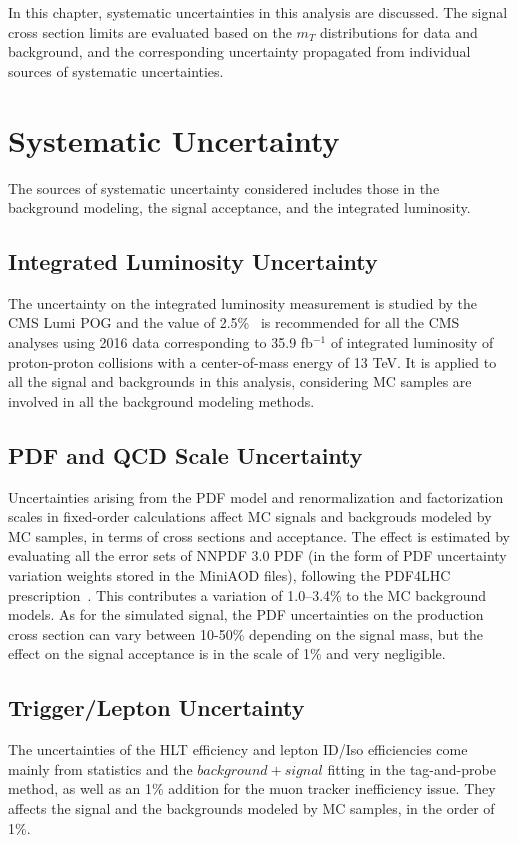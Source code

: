 In this chapter, systematic uncertainties in this analysis are discussed. The signal cross section limits are evaluated based on the $m_T$ distributions for data and background, and the corresponding uncertainty propagated from individual sources of systematic uncertainties.
\section{Systematic Uncertainty}
The sources of systematic uncertainty considered includes those in the background modeling, the signal acceptance, and the integrated luminosity.
\subsection{Integrated Luminosity Uncertainty}
The uncertainty on the integrated luminosity measurement is studied by the CMS Lumi POG and the value of 2.5\%~\cite{sys_lumi} is recommended for all the CMS analyses using 2016 data corresponding to 35.9 fb$^{-1}$ of integrated luminosity of proton-proton collisions with a center-of-mass energy of 13 TeV. It is applied to all the signal and backgrounds in this analysis, considering MC samples are involved in all the background modeling methods.
\subsection{PDF and QCD Scale Uncertainty}
Uncertainties arising from the PDF model and renormalization and factorization scales in fixed-order calculations affect MC signals and backgrouds modeled by MC samples, in terms of cross sections and acceptance. The effect is estimated by evaluating all the error sets of NNPDF 3.0 PDF (in the form of PDF uncertainty variation weights stored in the MiniAOD files), following the PDF4LHC prescription~\cite{sample_pdf4lhc}. This contributes a variation of 1.0–3.4\% to the MC background models. As for the simulated signal, the PDF uncertainties on the production cross section can vary between 10-50\% depending on the signal mass, but the effect on the signal acceptance is in the scale of 1\% and very negligible.
\subsection{Trigger/Lepton Uncertainty}
The uncertainties of the HLT efficiency and lepton ID/Iso efficiencies come mainly from statistics and the $background+signal$ fitting in the tag-and-probe method, as well as an 1\% addition for the muon tracker inefficiency issue. They affects the signal and the backgrounds modeled by MC samples, in the order of 1\%. 
